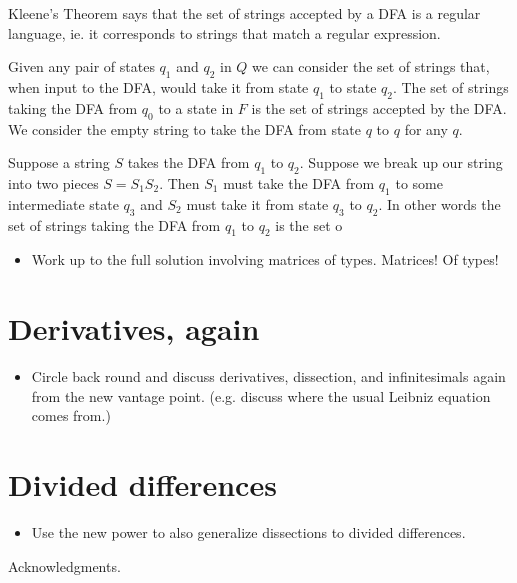 \documentclass[authoryear,preprint]{sigplanconf}
\begin{document}
Kleene's Theorem says that the set of strings accepted by a DFA is a regular language, ie. it corresponds to strings that match a regular expression.

Given any pair of states $q_1$ and $q_2$ in $Q$ we can consider the set of strings that, when input to the DFA, would take it from state $q_1$ to state $q_2$. The set of strings taking the DFA from $q_0$ to a state in $F$ is the set of strings accepted by the DFA. We consider the empty string to take the DFA from state $q$ to $q$ for any $q$.

Suppose a string $S$ takes the DFA from $q_1$ to $q_2$. Suppose we break up our string into two pieces $S=S_1S_2$. Then $S_1$ must take the DFA from $q_1$ to some intermediate state $q_3$ and $S_2$ must take it from state $q_3$ to $q_2$. In other words the set of strings taking the DFA from $q_1$ to $q_2$ is the set o

\begin{itemize}
\item Work up to the full solution involving matrices of types.
  Matrices!  Of types!
\end{itemize}

\section{Derivatives, again}
\label{sec:derivatives-again}

\begin{itemize}
\item Circle back round and discuss derivatives, dissection, and
  infinitesimals again from the new vantage point.  (e.g. discuss
  where the usual Leibniz equation comes from.)
\end{itemize}

\section{Divided differences}
\label{sec:divided-differences}

\begin{itemize}
\item Use the new power to also generalize dissections to divided
  differences.
\end{itemize}

\acks

Acknowledgments.



\end{document}

